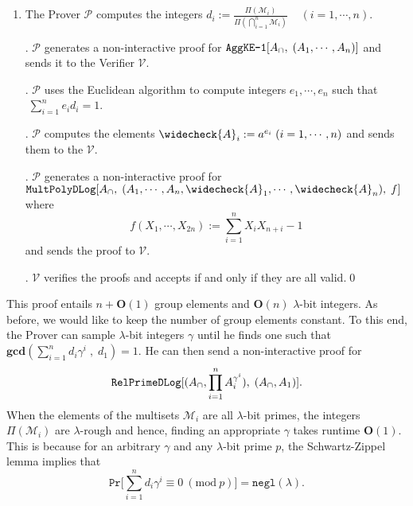 \documentclass[11pt, lettersize, notitlepage, leqno, footskip=0.6cm]{article}
\newcommand{\pl}{\prod\limits}
\newcommand{\slim}{\sum\limits}
\newcommand{\ttt}{\texttt}
\newcommand{\negl}{\ttt{{negl}}}
\newcommand{\mc}{\mathcal}
\newcommand{\mbf}{\mathbf}
\newcommand{\lam}{\lambda}
\newcommand{\weck}{\widecheck}
\newcommand{\bO}{\mbf{O}}
\newcommand{\mP}{\mc{P}}
\newcommand{\V}{\mc{V}}
\newcommand{\mcM}{\mc{M}}
\newcommand{\vs}{\vspace{-0.15cm}}
\newcommand{\noin}{\noindent}
\newcommand{\Mod}[1]{\ (\mathrm{mod}\ #1)}
\newcommand{\GCD}{\mbf{gcd}}
\numberwithin{equation}{section}
\begin{document}
\begin{enumerate}[wide, labelwidth=!, labelindent=0pt]\vs \item The Prover $\mP$ computes the integers $d_i:= \frac{\Pi(\mc{M}_i)}{\Pi({\bigcap\limits_{i=1}^n} \mc{M}_i)}\;\;\;\; (i=1,\cdots,n).$

\noin 2. $\mP$ generates a non-interactive proof for $\ttt{AggKE-1}[A_{\tt{\cap}},\;(A_1,\cdots,A_n)]$ and sends it to the Verifier $\V$.

\noin 3. $\mP$ uses the Euclidean algorithm to compute integers $e_1,\cdots,e_n$ such that $\;\slim_{i=1}^n e_id_i = 1$.

\noin 4. $\mP$ computes the elements $\weck{A}_i := a^{e_i}\; (i=1,\cdots,n)$ and sends them to the $\V$.

\noin 5. $\mP$ generates a non-interactive proof for $\ttt{MultPolyDLog}[A_{\tt{\cap}},\; (A_1,\cdots,A_n, \weck{A}_1,\cdots,\weck{A}_n),\;f]$ where \vs $$f(X_1,\cdots,X_{2n}):= \slim_{i=1}^n X_iX_{n+i} - 1 $$ and sends the proof to $\V$.

\noin 6. $\V$ verifies the proofs and accepts if and only if they are all valid.\qed \end{enumerate}

This proof entails $n+\bO(1)$ group elements and $\bO(n)$ $\lam$-bit integers. As before, we would like to keep the number of group elements constant. To this end, the Prover can sample $\lam$-bit integers $\gamma$ until he finds one such that $\GCD(\sum_{i=1}^n d_i\gamma^i\;,\; d_1) = 1 .$ He can then send a non-interactive proof for \vs $$\ttt{RelPrimeDLog}[(A_{\tt{\cap}},\pl_{i=1}^n A_i^{\gamma^i}),\;(A_{\tt{\cap}}, A_1)].$$ When the elements of the multisets $\mc{M}_i$ are all $\lam$-bit primes, the integers $\Pi(\mcM_i)$ are $\lam$-rough and hence, finding an appropriate $\gamma$ takes runtime $\bO(1)$. This is because for an arbitrary $\gamma$ and any $\lam$-bit prime $p$, the Schwartz-Zippel lemma implies that \vs $$\ttt{Pr}\Big[\slim_{i=1}^n d_i\gamma^i \equiv 0\Mod{p} \Big] = \negl(\lam). $$ 
\end{document}
